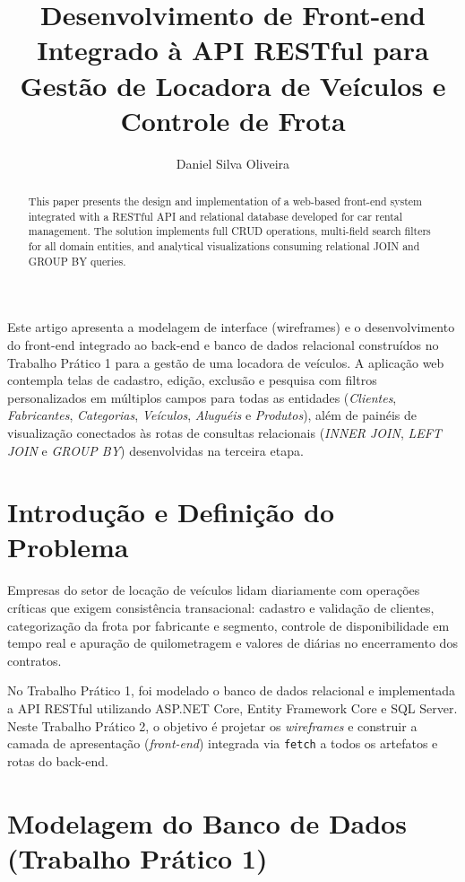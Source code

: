 \documentclass[12pt]{article}
\title{Desenvolvimento de Front-end Integrado à API RESTful para Gestão de Locadora de Veículos e Controle de Frota}
\author{Daniel Silva Oliveira\inst{1}}
\begin{document}
\maketitle

\begin{abstract}
  This paper presents the design and implementation of a web-based front-end system integrated with a RESTful API and relational database developed for car rental management. The solution implements full CRUD operations, multi-field search filters for all domain entities, and analytical visualizations consuming relational JOIN and GROUP BY queries.
\end{abstract}

\begin{resumo}
  Este artigo apresenta a modelagem de interface (wireframes) e o desenvolvimento do front-end integrado ao back-end e banco de dados relacional construídos no Trabalho Prático 1 para a gestão de uma locadora de veículos. A aplicação web contempla telas de cadastro, edição, exclusão e pesquisa com filtros personalizados em múltiplos campos para todas as entidades (\textit{Clientes}, \textit{Fabricantes}, \textit{Categorias}, \textit{Veículos}, \textit{Aluguéis} e \textit{Produtos}), além de painéis de visualização conectados às rotas de consultas relacionais (\textit{INNER JOIN}, \textit{LEFT JOIN} e \textit{GROUP BY}) desenvolvidas na terceira etapa.
\end{resumo}

\section{Introdução e Definição do Problema}

Empresas do setor de locação de veículos lidam diariamente com operações críticas que exigem consistência transacional: cadastro e validação de clientes, categorização da frota por fabricante e segmento, controle de disponibilidade em tempo real e apuração de quilometragem e valores de diárias no encerramento dos contratos.

No Trabalho Prático 1, foi modelado o banco de dados relacional e implementada a API RESTful utilizando ASP.NET Core, Entity Framework Core e SQL Server. Neste Trabalho Prático 2, o objetivo é projetar os \textit{wireframes} e construir a camada de apresentação (\textit{front-end}) integrada via \texttt{fetch} a todos os artefatos e rotas do back-end.

\section{Modelagem do Banco de Dados (Trabalho Prático 1)}
\end{document}
